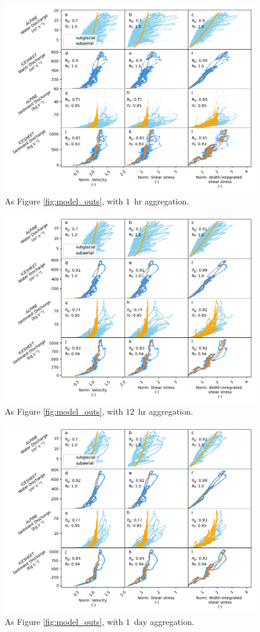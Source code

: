 \documentclass[draft]{agujournal2019}
\newcommand{\unit}[1]{$\mathrm{#1}$}
\begin{document}
\begin{center}
  \begin{figure}[!h]
    \includegraphics[width=0.7\linewidth]{Fig3_hr.png}
    \caption{As Figure \ref{fig:model_outs}, with $1$ \,\unit{hr} aggregation.}
    \label{fig:model_outs_1hr}
  \end{figure}
\end{center}

\begin{center}
  \begin{figure}[!h]
    \includegraphics[width=0.7\linewidth]{Fig3_12hr.png}
    \caption{As Figure \ref{fig:model_outs}, with $12$ \,\unit{hr} aggregation.}
    \label{fig:model_outs_12hr}
  \end{figure}
\end{center}


\begin{center}
  \begin{figure}[!h]
    \includegraphics[width=0.7\linewidth]{Fig3_1day.png}
    \caption{As Figure \ref{fig:model_outs}, with $1$ \,\unit{day} aggregation.}
    \label{fig:model_outs_1day}
  \end{figure}
\end{center}
\end{document}
